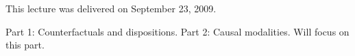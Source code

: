 This lecture was delivered on September 23, 2009.

Part 1: Counterfactuals and dispositions.
Part 2: Causal modalities. Will focus on this part.